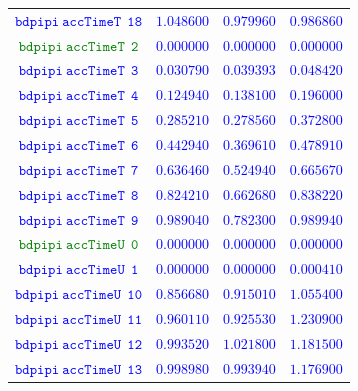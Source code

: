 \documentclass[10pt,a4paper]{article}
\begin{document}
\begin{table}[h!]
{\begin{tabular}{cccc}
\textcolor{blue}{$\mathtt{bdpipi~accTimeT~~18}$} & \textcolor{blue}{$1.048600$}& \textcolor{blue}{$0.979960$}& \textcolor{blue}{$0.986860$}\\
\textcolor{Green}{$\mathtt{bdpipi~accTimeT~~2}$} & \textcolor{blue}{$0.000000$}& \textcolor{blue}{$0.000000$}& \textcolor{blue}{$0.000000$}\\
\textcolor{blue}{$\mathtt{bdpipi~accTimeT~~3}$} & \textcolor{blue}{$0.030790$}& \textcolor{blue}{$0.039393$}& \textcolor{blue}{$0.048420$}\\
\textcolor{blue}{$\mathtt{bdpipi~accTimeT~~4}$} & \textcolor{blue}{$0.124940$}& \textcolor{blue}{$0.138100$}& \textcolor{blue}{$0.196000$}\\
\textcolor{blue}{$\mathtt{bdpipi~accTimeT~~5}$} & \textcolor{blue}{$0.285210$}& \textcolor{blue}{$0.278560$}& \textcolor{blue}{$0.372800$}\\
\textcolor{blue}{$\mathtt{bdpipi~accTimeT~~6}$} & \textcolor{blue}{$0.442940$}& \textcolor{blue}{$0.369610$}& \textcolor{blue}{$0.478910$}\\
\textcolor{blue}{$\mathtt{bdpipi~accTimeT~~7}$} & \textcolor{blue}{$0.636460$}& \textcolor{blue}{$0.524940$}& \textcolor{blue}{$0.665670$}\\
\textcolor{blue}{$\mathtt{bdpipi~accTimeT~~8}$} & \textcolor{blue}{$0.824210$}& \textcolor{blue}{$0.662680$}& \textcolor{blue}{$0.838220$}\\
\textcolor{blue}{$\mathtt{bdpipi~accTimeT~~9}$} & \textcolor{blue}{$0.989040$}& \textcolor{blue}{$0.782300$}& \textcolor{blue}{$0.989940$}\\
\textcolor{Green}{$\mathtt{bdpipi~accTimeU~~0}$} & \textcolor{blue}{$0.000000$}& \textcolor{blue}{$0.000000$}& \textcolor{blue}{$0.000000$}\\
\textcolor{blue}{$\mathtt{bdpipi~accTimeU~~1}$} & \textcolor{blue}{$0.000000$}& \textcolor{blue}{$0.000000$}& \textcolor{blue}{$0.000410$}\\
\textcolor{blue}{$\mathtt{bdpipi~accTimeU~~10}$} & \textcolor{blue}{$0.856680$}& \textcolor{blue}{$0.915010$}& \textcolor{blue}{$1.055400$}\\
\textcolor{blue}{$\mathtt{bdpipi~accTimeU~~11}$} & \textcolor{blue}{$0.960110$}& \textcolor{blue}{$0.925530$}& \textcolor{blue}{$1.230900$}\\
\textcolor{blue}{$\mathtt{bdpipi~accTimeU~~12}$} & \textcolor{blue}{$0.993520$}& \textcolor{blue}{$1.021800$}& \textcolor{blue}{$1.181500$}\\
\textcolor{blue}{$\mathtt{bdpipi~accTimeU~~13}$} & \textcolor{blue}{$0.998980$}& \textcolor{blue}{$0.993940$}& \textcolor{blue}{$1.176900$}\\

\end{tabular}}
\end{table}
\end{document}
